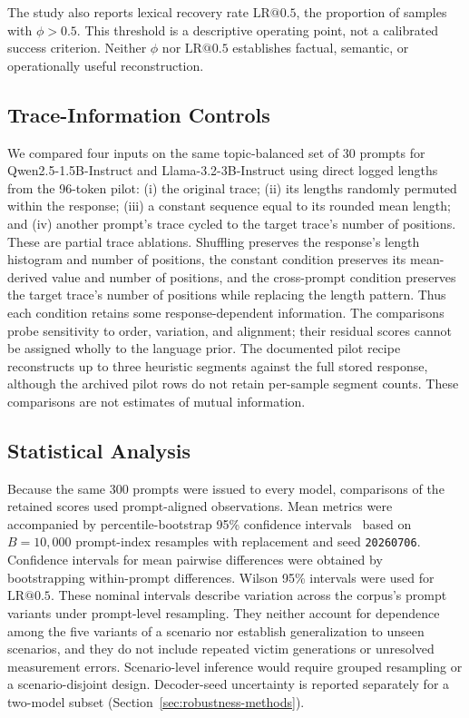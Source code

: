 \documentclass[electronics,article,submit,pdftex,moreauthors]{Definitions/mdpi}
\begin{document}
The study also reports lexical recovery rate $\mathrm{LR}@0.5$, the proportion of samples with $\phi>0.5$. This threshold is a descriptive operating point, not a calibrated success criterion. Neither $\phi$ nor $\mathrm{LR}@0.5$ establishes factual, semantic, or operationally useful reconstruction.

\subsection{Trace-Information Controls}
We compared four inputs on the same topic-balanced set of 30 prompts for Qwen2.5-1.5B-Instruct and Llama-3.2-3B-Instruct using direct logged lengths from the 96-token pilot: (i) the original trace; (ii) its lengths randomly permuted within the response; (iii) a constant sequence equal to its rounded mean length; and (iv) another prompt's trace cycled to the target trace's number of positions. These are partial trace ablations. Shuffling preserves the response's length histogram and number of positions, the constant condition preserves its mean-derived value and number of positions, and the cross-prompt condition preserves the target trace's number of positions while replacing the length pattern. Thus each condition retains some response-dependent information. The comparisons probe sensitivity to order, variation, and alignment; their residual scores cannot be assigned wholly to the language prior. The documented pilot recipe reconstructs up to three heuristic segments against the full stored response, although the archived pilot rows do not retain per-sample segment counts. These comparisons are not estimates of mutual information.

\subsection{Statistical Analysis}
Because the same 300 prompts were issued to every model, comparisons of the retained scores used prompt-aligned observations. Mean metrics were accompanied by percentile-bootstrap 95\% confidence intervals~\cite{efron1994bootstrap} based on $B=10{,}000$ prompt-index resamples with replacement and seed \texttt{20260706}. Confidence intervals for mean pairwise differences were obtained by bootstrapping within-prompt differences. Wilson 95\% intervals were used for $\mathrm{LR}@0.5$. These nominal intervals describe variation across the corpus's prompt variants under prompt-level resampling. They neither account for dependence among the five variants of a scenario nor establish generalization to unseen scenarios, and they do not include repeated victim generations or unresolved measurement errors. Scenario-level inference would require grouped resampling or a scenario-disjoint design. Decoder-seed uncertainty is reported separately for a two-model subset (Section~\ref{sec:robustness-methods}).
\end{document}

